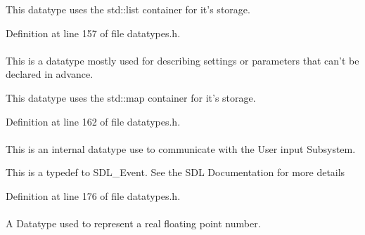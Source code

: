 This datatype uses the std\-::list container for it's storage. 

Definition at line 157 of file datatypes.\-h.

\hypertarget{namespaceMezzanine_a171daeff3f8f6577a810baf6bb746626}{
\paragraph[{Name\-Value\-Pair\-Map}]{}}\label{namespaceMezzanine_a171daeff3f8f6577a810baf6bb746626}


This is a datatype mostly used for describing settings or parameters that can't be declared in advance. 

This datatype uses the std\-::map container for it's storage. 

Definition at line 162 of file datatypes.\-h.

\hypertarget{namespaceMezzanine_ae8d4c0ab783af89a250b0225b75753e5}{
\paragraph[{Raw\-Event}]{}}\label{namespaceMezzanine_ae8d4c0ab783af89a250b0225b75753e5}


This is an internal datatype use to communicate with the User input Subsystem. 

This is a typedef to S\-D\-L\-\_\-\-Event. See the S\-D\-L Documentation for more details 

Definition at line 176 of file datatypes.\-h.

\hypertarget{namespaceMezzanine_a726731b1a7df72bf3583e4a97282c6f6}{
\paragraph[{Real}]{}}\label{namespaceMezzanine_a726731b1a7df72bf3583e4a97282c6f6}


A Datatype used to represent a real floating point number. 

